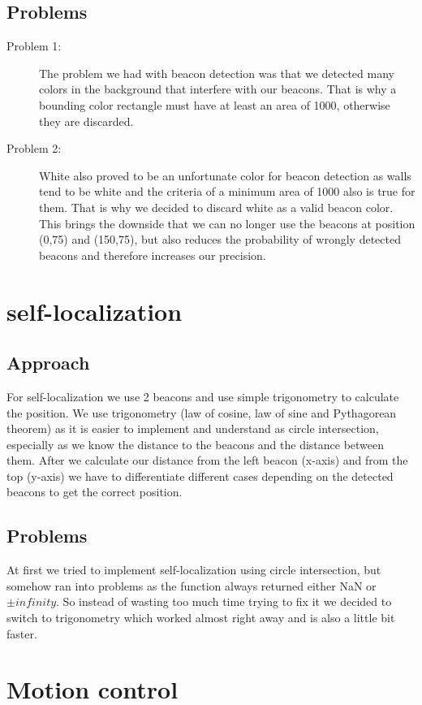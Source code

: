 \documentclass[703031]{iisreport}
\begin{document}
\subsection{Problems}

	\begin{description}
		\item [Problem 1:] The problem we had with beacon detection was that we detected many colors in the background that interfere with our beacons. That is why a bounding color rectangle must have at least an area of 1000, otherwise they are discarded.
		\item [Problem 2:] White also proved to be an unfortunate color for beacon detection as walls tend to be white and the criteria of a minimum area of 1000 also is true for them. That is why we decided to discard white as a valid beacon color. This brings the downside that we can no longer use the beacons at position (0,75) and (150,75), but also reduces the probability of wrongly detected beacons and therefore increases our precision.
	\end{description}


\section{self-localization}
\subsection{Approach}
For self-localization we use 2 beacons and use simple trigonometry to calculate the position. We use trigonometry (law of cosine, law of sine and Pythagorean theorem) as it is easier to implement and understand as circle intersection, especially as we know the distance to the beacons and the distance between them.
After we calculate our distance from the left beacon (x-axis) and from the top (y-axis) we have to differentiate different cases depending on the detected beacons to get the correct position.
\subsection{Problems}
At first we tried to implement self-localization using circle intersection, but somehow ran into problems as the function always returned either NaN or $\pm infinity$. So instead of wasting too much time trying to fix it we decided to switch to trigonometry which worked almost right away and is also a little bit faster.
\section{Motion control}
\end{document}
